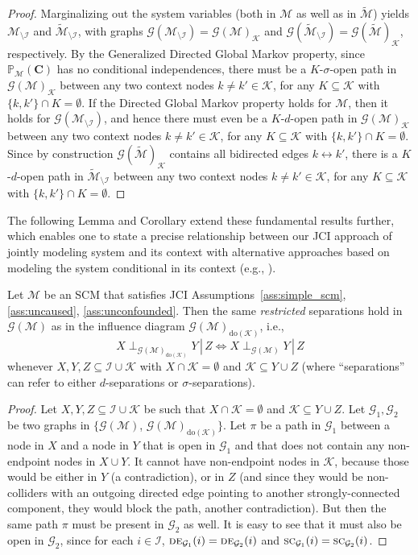 \documentclass[twoside,11pt]{article}
\DeclareMathOperator*{\SEP}{\perp}
\newcommand\sep[4]{{#1} \SEP_{#4} {#2} \given {#3}}
\newcommand{\Prb}{\mathbb{P}}
\newcommand\B[1]{\bm{#1}}
\newcommand\C[1]{\mathcal{#1}}
\newcommand\mathbfsc[1]{\text{\normalfont\scshape#1}}
\newcommand\desub[2]{\mathbfsc{de}_{#1}(#2)}
\newcommand\sccsub[2]{\mathbfsc{sc}_{#1}(#2)}
\newcommand\given{\,|\,}
\newcommand{\oto}{\leftrightarrow}
\newcommand{\intervene}{\mathrm{do}}
\newcommand{\JCIAB}{\ref{ass:uncaused}, \ref{ass:unconfounded}}
\begin{document}
\begin{proof}
Marginalizing out the system variables (both in $\C{M}$ as well as in $\tilde{\C{M}}$) yields
$\C{M}_{\setminus\C{I}}$ and $\tilde{\C{M}}_{\setminus\C{I}}$, with graphs
$\C{G}(\C{M}_{\setminus\C{I}}) = \C{G}(\C{M})_{\C{K}}$ and 
$\C{G}(\tilde{\C{M}}_{\setminus\C{I}}) = \C{G}(\tilde{\C{M}})_{\C{K}}$, respectively. 
By the Generalized Directed Global Markov property, since 
$\Prb_{\C{M}}(\B{C})$ has no conditional independences, there must be a $K$-$\sigma$-open path in 
$\C{G}(\C{M})_{\C{K}}$ between any
two context nodes $k \ne k' \in \C{K}$, for any $K\subseteq \C{K}$ with $\{k,k'\} \cap K = \emptyset$. 
If the Directed Global Markov property holds for $\C{M}$, then it holds for $\C{G}(\C{M}_{\setminus\C{I}})$, 
and hence there must even be a $K$-$d$-open path in $\C{G}(\C{M})_{\C{K}}$ between any two context nodes 
$k \ne k' \in \C{K}$, for any $K\subseteq \C{K}$ with $\{k,k'\} \cap K = \emptyset$. 
Since by construction $\C{G}(\tilde{\C{M}})_{\C{K}}$ contains all bidirected edges $k \oto k'$,
there is a $K$-$d$-open path in $\tilde{\C{M}}_{\setminus\C{I}}$ between any two context nodes
$k \ne k' \in \C{K}$, for any $K\subseteq \C{K}$ with $\{k,k'\} \cap K = \emptyset$.
\end{proof}

The following Lemma and Corollary extend these fundamental results further, which enables one to state
a precise relationship between our JCI approach of jointly modeling system and its context with
alternative approaches based on modeling the system conditional in its context (e.g., \citet{YangKatcoffUhler2018}).
\begin{lemma}
  Let $\C{M}$ be an SCM that satisfies JCI Assumptions~\ref{ass:simple_scm}, \JCIAB. 
  Then the same \emph{restricted} separations hold in $\C{G}(\C{M})$ as in the influence diagram
  $\C{G}(\C{M})_{\intervene(\C{K})}$, i.e.,
    $$\sep{X}{Y}{Z}{\C{G}(\C{M})_{\intervene(\C{K})}} \iff \sep{X}{Y}{Z}{\C{G}(\C{M})}$$
  whenever $X,Y,Z \subseteq \C{I} \cup \C{K}$ with $X \cap \C{K} = \emptyset$ and $\C{K} \subseteq Y \cup Z$ 
  (where ``separations'' can refer to either $d$-separations or $\sigma$-separations).
\end{lemma}
\begin{proof}
Let $X,Y,Z \subseteq \C{I}\cup\C{K}$ be such that $X \cap \C{K} = \emptyset$ and $\C{K} \subseteq Y \cup Z$. 
Let $\C{G}_1, \C{G}_2$ be two graphs in $\{${}$\C{G}(\C{M})$, $\C{G}(\C{M})_{\intervene(\C{K})}\}$. 
Let $\pi$ be a path in $\C{G}_1$ between a node in $X$ and a node in $Y$ that is open in $\C{G}_1$ and that does not
contain any non-endpoint nodes in $X \cup Y$. It cannot have non-endpoint nodes in $\C{K}$, because those would be either 
in $Y$ (a contradiction), or in $Z$ (and since they would be non-colliders with an outgoing directed edge pointing to another strongly-connected component, they would block the path, another contradiction). But then the same path $\pi$ must be 
present in $\C{G}_2$ as well. It is easy to see that it must also be open in $\C{G}_2$, since for each $i \in \C{I}$,
$\desub{\C{G}_1}{i} = \desub{\C{G}_2}{i}$ and $\sccsub{\C{G}_1}{i} = \sccsub{\C{G}_2}{i}$.
\end{proof}
\end{document}
